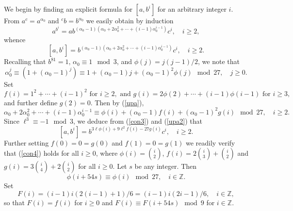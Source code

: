 \documentclass{amsart}
\theoremstyle{definition}
\theoremstyle{remark}
\newcommand \Z{{\mathbb Z}}
\begin{document}
{We begin by finding an explicit formula for $[a,b^i]$ for an arbitrary integer $i$.
From $a^c=a^{\alpha_0}$ and ${}^c b=b^{\alpha_0}$ we easily obtain by induction
$$
a^{b^i}=a b^{(\alpha_0-1)(\alpha_0+2\alpha_0^2+\cdots+(i-1)\alpha_0^{i-1})} c^i,\quad i\geq 2,
$$
whence
\begin{equation}
\label{con3}
[a,b^i]=b^{(\alpha_0-1)(\alpha_0+2\alpha_0^2+\cdots+(i-1)\alpha_0^{i-1})} c^i,\quad i\geq 2.
\end{equation}
Recalling that $b^{81}=1$, $\alpha_0\equiv 1\mod 3$, and $\phi(j)=j(j-1)/2$, we note that
\begin{equation}
\label{upa}
\alpha_0^j\equiv (1+(\alpha_0-1)^j)\equiv 1+(\alpha_0-1)j+(\alpha_0-1)^2 \phi(j)\mod 27,\quad j\geq 0.
\end{equation}
Set 
$$
f(i)=1^2+\cdots+(i-1)^2\text{ for }i\geq 2,\text{ and }g(i)=2\phi(2)+\cdots+(i-1)\phi(i-1)\text{ for }i\geq 3,
$$ 
and further define $g(2)=0$. Then by (\ref{upa}),
\begin{equation}
\label{upa2}
\alpha_0+2\alpha_0^2+\cdots+(i-1)\alpha_0^{i-1}\equiv \phi(i)+ (\alpha_0-1)f(i)+
(\alpha_0-1)^2g(i)\mod 27,\quad i\geq 2.
\end{equation}
Since $\ell^3\equiv -1\mod 3$, we deduce from (\ref{con3}) and (\ref{upa2}) that
\begin{equation}
\label{con4}
[a,b^i]=b^{3\ell\phi(i)+ 9\ell^2 f(i)-27g(i)} c^i,\quad i\geq 2.
\end{equation}
Further setting $f(0)=0=g(0)$ and $f(1)=0=g(1)$ we readily verify that
(\ref{con4}) holds for all $i\geq 0$, where
$\phi(i)=\binom{i}{2}$, $f(i)=2\binom{i}{3}+\binom{i}{2}$ and $g(i)=3\binom{i}{4}+2\binom{i}{2}$ for all $i\geq 0$.
Let $s$ be any integer. Then
$$
\phi(i+54s)\equiv \phi(i)\mod 27,\quad i\in\Z.
$$
Set
$$
F(i)=(i-1)i(2(i-1)+1)/6=(i-1)i(2i-1)/6,\quad i\in\Z,
$$
so that $F(i)=f(i)$ for $i\geq 0$ and $F(i)\equiv F(i+54s)\mod 9$ for $i\in\Z$.
 

}
\end{document}

